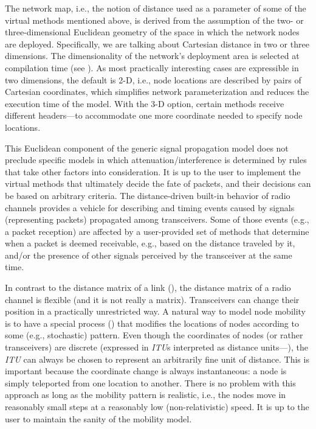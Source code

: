 The network map, i.e., the notion of distance used as a parameter of some of
the virtual methods mentioned above, is derived from the assumption of the
two- or three-dimensional Euclidean
geometry of the space in which the network nodes are deployed.
Specifically, we are talking about Cartesian distance in two or three
dimensions.
The dimensionality of the network's deployment area is selected at
compilation time (see ).
As most practically interesting cases are expressible in two dimensions,
the default is 2-D, i.e., node locations are described by pairs of
Cartesian coordinates,
which simplifies network parameterization and reduces the execution time
of the model.
With the 3-D option, certain methods receive different headers---to
accommodate one more coordinate needed to specify node locations.

This Euclidean component of the generic signal propagation model
does not preclude specific
models in which attenuation/interference is determined
by rules that take other factors into consideration.
It is up to the user to implement the virtual methods that ultimately decide 
the fate of packets, and their decisions can be based on arbitrary criteria.
The distance-driven built-in behavior of radio channels provides a
vehicle for describing and timing events caused by signals (representing
packets) propagated among transceivers.
Some of those events (e.g., a packet reception) are affected by a
user-provided set of methods that determine when a packet is deemed
receivable, e.g., based on the distance traveled by it, and/or the presence
of other signals perceived by the transceiver at the same time.

In contrast to the distance matrix of a link (), the distance
matrix of a radio channel is flexible (and it is not really a matrix).
Transceivers can change their position in a practically unrestricted way.
A natural way to model node mobility is to have a special process
() that modifies the locations of nodes according to some
(e.g., stochastic) pattern.
Even though the coordinates of nodes (or rather transceivers) are discrete
(expressed in {\em ITU\/}s interpreted as distance units---),
the {\em ITU\/} can always be chosen to represent an arbitrarily fine unit of
distance.
This is important because the coordinate change is always instantaneous:
a node is simply teleported from one location to another.
There is no problem with this approach as long as the mobility pattern
is realistic, i.e., the nodes move in reasonably small steps at a
reasonably low (non-relativistic) speed.
It is up to the user to maintain the sanity of the mobility model.

